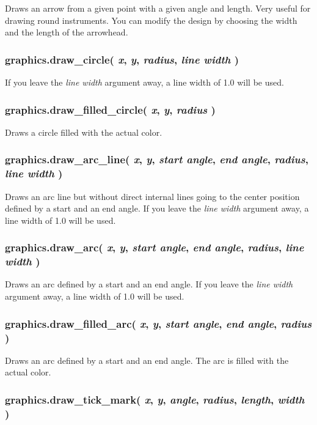 \documentclass[11pt,parskip=half,a4paper]{scrartcl}
\begin{document}
Draws an arrow from a given point with a given angle and length. Very useful for drawing round instruments. You can modify the design by choosing the width and the length of the arrowhead.

\subsubsection{graphics.draw\_circle( \emph{x}, \emph{y}, \emph{radius}, \emph{line width} )}

If you leave the \emph{line width} argument away, a line width of 1.0 will be used.

\subsubsection{graphics.draw\_filled\_circle( \emph{x}, \emph{y}, \emph{radius} )}

Draws a circle filled with the actual color.

\subsubsection{graphics.draw\_arc\_line( \emph{x}, \emph{y}, \emph{start angle}, \emph{end angle}, \emph{radius}, \emph{line width} )}

Draws an arc line but without direct internal lines going to the center position defined by a start and an end angle. If you leave the \emph{line width} argument away, a line width of 1.0 will be used.

\subsubsection{graphics.draw\_arc( \emph{x}, \emph{y}, \emph{start angle}, \emph{end angle}, \emph{radius}, \emph{line width} )}

Draws an arc defined by a start and an end angle. If you leave the \emph{line width} argument away, a line width of 1.0 will be used.

\subsubsection{graphics.draw\_filled\_arc( \emph{x}, \emph{y}, \emph{start angle}, \emph{end angle}, \emph{radius} )}

Draws an arc defined by a start and an end angle. The arc is filled with the actual color.

\subsubsection{graphics.draw\_tick\_mark( \emph{x}, \emph{y}, \emph{angle}, \emph{radius}, \emph{length}, \emph{width} )}
\end{document}

